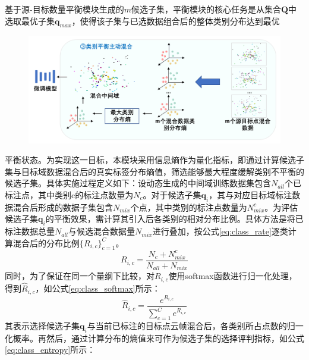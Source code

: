     基于源-目标数量平衡模块生成的$m$候选子集，平衡模块的核心任务是从集合$\mathbf{Q}$中选取最优子集$\mathbf{q}_{max}$，使得该子集与已选数据组合后的整体类别分布达到最优
    \begin{figure}[h]
        \centering
        \includegraphics[width = \textwidth, scale=0.5]{ljx/figure/4-3am.pdf}
        \label{fig:4-3}
    \end{figure}
    平衡状态。为实现这一目标，本模块采用信息熵作为量化指标，即通过计算候选子集与目标域数据混合后的真实标签分布熵值，筛选能够最大程度缓解类别不平衡的候选子集。具体实施过程定义如下：设动态生成的中间域训练数据集包含$N_{all}$个已标注点，其中类别c的标注点数量为$N_c$。对于候选子集$\mathbf{q}_i$，其与对应目标域标注数据混合后形成的数据子集包含$N_{mix}$个点，其中类别的标注点数量为$N_{mix}^c$。为评估候选子集$\mathbf{q}_i$的平衡效果，需计算其引入后各类别的相对分布比例。具体方法是将已标注数据总量$N_{all}$与候选混合数据量$N_{mix}$进行叠加，按公式\eqref{eq:class_rate}逐类计算混合后的分布比例$\{R_{i,c}\}^C_{c=1}$。%
    \begin{equation}
        \label{eq:class_rate}
        R_{i,c} = \frac{N_c+N^c_{mix}}{N_{all}+N_{mix}}
    \end{equation}
    同时，为了保证在同一个量纲下比较，对$R_{i,c}$使用softmax函数进行归一化处理，得到$\hat{R}_{i,c}$，如公式\eqref{eq:class_softmax}所示：
    \begin{equation}
        \label{eq:class_softmax}
        \hat{R}_{i,c}=\frac{e^{R_{i,c}}}{\sum^C_{c=1}e^{R_{i,c}}}
    \end{equation}
    其表示选择候选子集$\mathbf{q}_i$与当前已标注的目标点云帧混合后，各类别所占点数的归一化概率。再然后，通过计算分布的熵值来可作为候选子集的选择评判指标，如公式\eqref{eq:class_entropy}所示：
